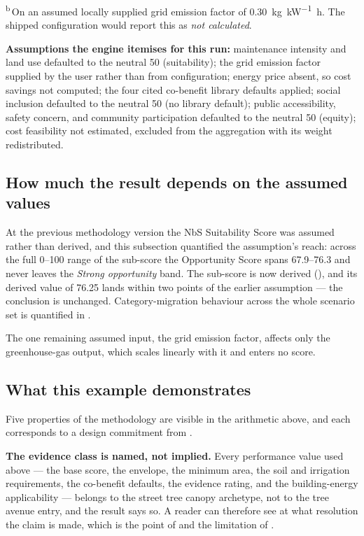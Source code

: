 \noindent\footnotesize\textsuperscript{b}\,On an assumed locally supplied grid
emission factor of \qty{0.30}{\kilo\gram\per\kilo\watt\hour}. The shipped
configuration would report this as \emph{not calculated}.\normalsize

\medskip

\noindent\textbf{Assumptions the engine itemises for this run:} maintenance
intensity and land use defaulted to the neutral 50 (suitability); the grid
emission factor supplied by the user rather than from configuration; energy
price absent, so cost savings not computed; the four cited co-benefit library
defaults applied; social inclusion defaulted to the neutral 50 (no library
default); public accessibility, safety concern, and community participation
defaulted to the neutral 50 (equity); cost feasibility not estimated, excluded
from the aggregation with its weight redistributed.

\subsection{How much the result depends on the assumed values}
\label{sec:we-assumptions}

At the previous methodology version the NbS Suitability Score was assumed
rather than derived, and this subsection quantified the assumption's reach:
across the full 0--100 range of the sub-score the Opportunity Score spans
\numrange{67.9}{76.3} and never leaves the \emph{Strong opportunity} band. The
sub-score is now derived (), and its derived value
of 76.25 lands within two points of the earlier assumption --- the conclusion
is unchanged. Category-migration behaviour across the whole scenario set is
quantified in .

The one remaining assumed input, the grid emission factor, affects only the
greenhouse-gas output, which scales linearly with it and enters no score.

\subsection{What this example demonstrates}

Five properties of the methodology are visible in the arithmetic above, and
each corresponds to a design commitment from .

\textbf{The evidence class is named, not implied.} Every performance value used
above --- the base score, the envelope, the minimum area, the soil and
irrigation requirements, the co-benefit defaults, the evidence rating, and the
building-energy applicability --- belongs to the street tree canopy archetype,
not to the tree avenue entry, and the result says so. A reader can therefore see
at what resolution the claim is made, which is the point of
 and the limitation of .

